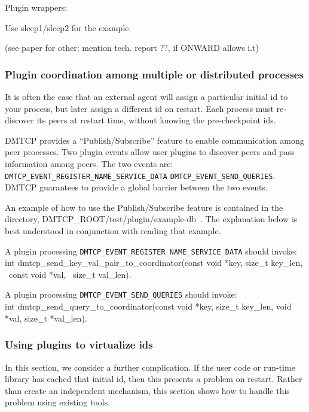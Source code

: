 \documentclass{article}
\begin{document}
Plugin wrappers:

Use sleep1/sleep2 for the example.

(see paper for other; mention tech. report ??, if ONWARD allows i.t)

\subsubsection{Plugin coordination among multiple or distributed processes}
\label{sec:publishSubscribe}

It is often the case that an external agent will assign a particular
initial id to your process, but later assign a different id on restart.
Each process must re-discover its peers at restart time, without knowing
the pre-checkpoint ids.

DMTCP provides a ``Publish/Subscribe'' feature to enable communication among
peer processes. Two plugin events allow user
plugins to discover peers and pass information among peers.
The two events are:  {\tt DMTCP\_EVENT\_REGISTER\_NAME\_SERVICE\_DATA}
 {\tt DMTCP\_EVENT\_SEND\_QUERIES}.  DMTCP guarantees to provide a global
barrier between the two events.

An example of how to use the Publish/Subscribe feature is contained
in the directory, DMTCP\_ROOT/test/plugin/example-db~.  The explanation below is best
understood in conjunction with reading that example.

A plugin processing {\tt DMTCP\_EVENT\_REGISTER\_NAME\_SERVICE\_DATA} should invoke: \\
int dmtcp\_send\_key\_val\_pair\_to\_coordinator(const void *key,
                                                   size\_t key\_len, \
                                                   const void *val, \
                                                   size\_t val\_len).

A plugin processing {\tt DMTCP\_EVENT\_SEND\_QUERIES} should invoke: \\
int dmtcp\_send\_query\_to\_coordinator(const void *key, size\_t key\_len,
                                            void *val, size\_t *val\_len).

\subsubsection{Using plugins to virtualize ids}

In this section, we consider a further complication.
If the user code or run-time library has cached that initial id, then
this presents a problem on restart.  Rather than create an independent
mechanism, this section shows how to handle this problem using existing tools.
\end{document}
